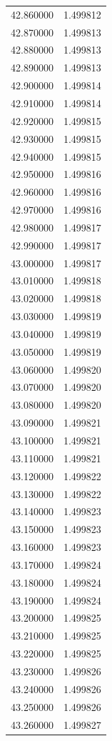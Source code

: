 \begin{tabular}{rr}
42.860000 & 1.499812 \\
42.870000 & 1.499813 \\
42.880000 & 1.499813 \\
42.890000 & 1.499813 \\
42.900000 & 1.499814 \\
42.910000 & 1.499814 \\
42.920000 & 1.499815 \\
42.930000 & 1.499815 \\
42.940000 & 1.499815 \\
42.950000 & 1.499816 \\
42.960000 & 1.499816 \\
42.970000 & 1.499816 \\
42.980000 & 1.499817 \\
42.990000 & 1.499817 \\
43.000000 & 1.499817 \\
43.010000 & 1.499818 \\
43.020000 & 1.499818 \\
43.030000 & 1.499819 \\
43.040000 & 1.499819 \\
43.050000 & 1.499819 \\
43.060000 & 1.499820 \\
43.070000 & 1.499820 \\
43.080000 & 1.499820 \\
43.090000 & 1.499821 \\
43.100000 & 1.499821 \\
43.110000 & 1.499821 \\
43.120000 & 1.499822 \\
43.130000 & 1.499822 \\
43.140000 & 1.499823 \\
43.150000 & 1.499823 \\
43.160000 & 1.499823 \\
43.170000 & 1.499824 \\
43.180000 & 1.499824 \\
43.190000 & 1.499824 \\
43.200000 & 1.499825 \\
43.210000 & 1.499825 \\
43.220000 & 1.499825 \\
43.230000 & 1.499826 \\
43.240000 & 1.499826 \\
43.250000 & 1.499826 \\
43.260000 & 1.499827 \\

\end{tabular}
